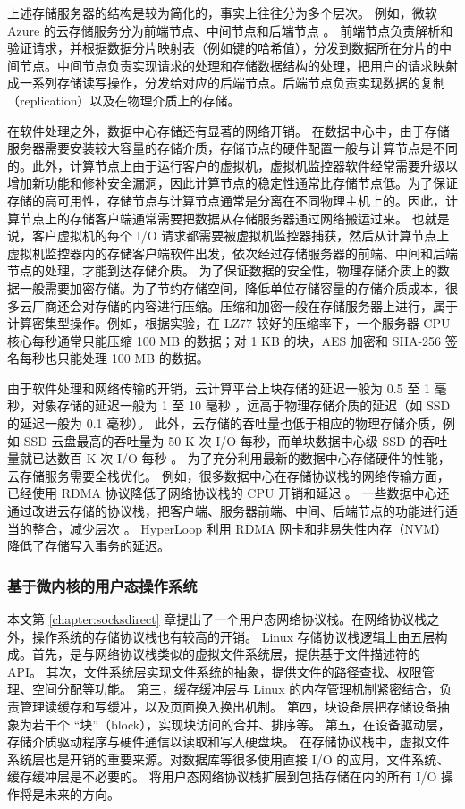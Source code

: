 上述存储服务器的结构是较为简化的，事实上往往分为多个层次。
例如，微软 Azure 的云存储服务分为前端节点、中间节点和后端节点 \cite{calder2011windows}。
前端节点负责解析和验证请求，并根据数据分片映射表（例如键的哈希值），分发到数据所在分片的中间节点。中间节点负责实现请求的处理和存储数据结构的处理，把用户的请求映射成一系列存储读写操作，分发给对应的后端节点。后端节点负责实现数据的复制（replication）以及在物理介质上的存储。

在软件处理之外，数据中心存储还有显著的网络开销。
在数据中心中，由于存储服务器需要安装较大容量的存储介质，存储节点的硬件配置一般与计算节点是不同的。此外，计算节点上由于运行客户的虚拟机，虚拟机监控器软件经常需要升级以增加新功能和修补安全漏洞，因此计算节点的稳定性通常比存储节点低。为了保证存储的高可用性，存储节点与计算节点通常是分离在不同物理主机上的。因此，计算节点上的存储客户端通常需要把数据从存储服务器通过网络搬运过来。
也就是说，客户虚拟机的每个 I/O 请求都需要被虚拟机监控器捕获，然后从计算节点上虚拟机监控器内的存储客户端软件出发，依次经过存储服务器的前端、中间和后端节点的处理，才能到达存储介质。
为了保证数据的安全性，物理存储介质上的数据一般需要加密存储。为了节约存储空间，降低单位存储容量的存储介质成本，很多云厂商还会对存储的内容进行压缩。压缩和加密一般在存储服务器上进行，属于计算密集型操作。例如，根据实验，在 LZ77 较好的压缩率下，一个服务器 CPU 核心每秒通常只能压缩 100 MB 的数据；对 1 KB 的块，AES 加密和 SHA-256 签名每秒也只能处理 100 MB 的数据。

由于软件处理和网络传输的开销，云计算平台上块存储的延迟一般为 0.5 至 1 毫秒，对象存储的延迟一般为 1 至 10 毫秒 \cite{jonas2019cloud}，远高于物理存储介质的延迟（如 SSD 的延迟一般为 0.1 毫秒）。
此外，云存储的吞吐量也低于相应的物理存储介质，例如 SSD 云盘最高的吞吐量为 50 K 次 I/O 每秒，而单块数据中心级 SSD 的吞吐量就已达数百 K 次 I/O 每秒 \cite{jonas2019cloud}。
为了充分利用最新的数据中心存储硬件的性能，云存储服务需要全栈优化。
例如，很多数据中心在存储协议栈的网络传输方面，已经使用 RDMA 协议降低了网络协议栈的 CPU 开销和延迟 \cite{guo2016rdma}。
一些数据中心还通过改进云存储的协议栈，把客户端、服务器前端、中间、后端节点的功能进行适当的整合，减少层次 \cite{nitro-blog}。
HyperLoop \cite{kim2018hyperloop} 利用 RDMA 网卡和非易失性内存（NVM）降低了存储写入事务的延迟。


\subsubsection{基于微内核的用户态操作系统}
\label{future:user-space-os}

本文第 \ref{chapter:socksdirect} 章提出了一个用户态网络协议栈。在网络协议栈之外，操作系统的存储协议栈也有较高的开销。
Linux 存储协议栈逻辑上由五层构成。首先，是与网络协议栈类似的虚拟文件系统层，提供基于文件描述符的 API。
其次，文件系统层实现文件系统的抽象，提供文件的路径查找、权限管理、空间分配等功能。
第三，缓存缓冲层与 Linux 的内存管理机制紧密结合，负责管理读缓存和写缓冲，以及页面换入换出机制。
第四，块设备层把存储设备抽象为若干个 ``块''（block），实现块访问的合并、排序等。
第五，在设备驱动层，存储介质驱动程序与硬件通信以读取和写入硬盘块。
在存储协议栈中，虚拟文件系统层也是开销的重要来源。对数据库等很多使用直接 I/O 的应用，文件系统、缓存缓冲层是不必要的。
将用户态网络协议栈扩展到包括存储在内的所有 I/O 操作将是未来的方向。

